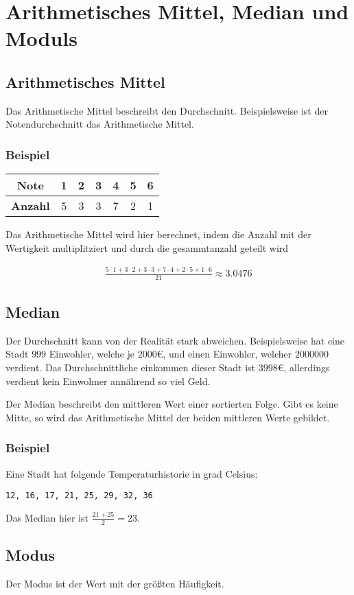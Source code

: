 \chapter{Arithmetisches Mittel, Median und Moduls}

\section{Arithmetisches Mittel}

Das Arithmetische Mittel beschreibt den Durchschnitt. Beispielsweise ist der
Notendurchschnitt das Arithmetische Mittel.

\subsection{Beispiel}

\begin{table}[htbp]
    \centering
    \begin{tabular}{|c|c|c|c|c|c|c|}
        \hline
        \textbf{Note}   & 1 & 2 & 3 & 4 & 5 & 6 \\
        \hline
        \textbf{Anzahl} & 5 & 3 & 3 & 7 & 2 & 1 \\
        \hline
    \end{tabular}
    \label{tab:noten_einfach}
\end{table}

Das Arithmetische Mittel wird hier berechnet, indem die Anzahl mit der
Wertigkeit multiplitziert und durch die gesammtanzahl geteilt wird

\begin{align*}
    \frac{5 \cdot 1 + 3 \cdot 2 + 3 \cdot 3 + 7 \cdot 4 + 2 \cdot 5 + 1 \cdot 6}{21} \approx 3.0476
\end{align*}

\section{Median}

Der Durchschnitt kann von der Realität stark abweichen. Beispielsweise hat eine
Stadt $999$ Einwohler, welche je $2000€$, und einen Einwohler, welcher
$2000000$ verdient. Das Durchschnittliche einkommen dieser Stadt ist $3998€$,
allerdings verdient kein Einwohner annährend so viel Geld.

Der Median beschreibt den mittleren Wert einer sortierten Folge. Gibt es keine
Mitte, so wird das Arithmetische Mittel der beiden mittleren Werte gebildet.

\subsection{Beispiel}

Eine Stadt hat folgende Temperaturhistorie in grad Celsius:

\texttt{12, 16, 17, 21, 25, 29, 32, 36}

Das Median hier ist $\frac{21 + 25}{2} = 23$.

\section{Modus}

Der Modus ist der Wert mit der größten Häufigkeit.